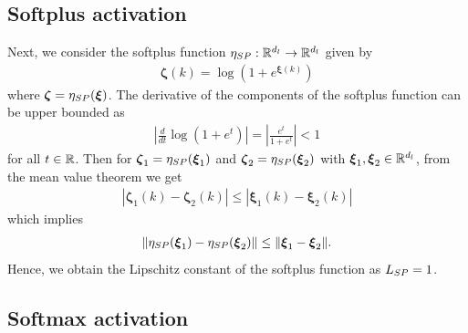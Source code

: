 \documentclass[review,supplement,onefignum,onetabnum]{siamonline250211}
\begin{document}
\subsection{Softplus activation}
Next, we consider the softplus function $\eta_{SP}: \mathbb{R}^{d_l} \rightarrow \mathbb{R}^{d_l}$ given by
%
\begin{equation}
\begin{split}
\boldsymbol{\zeta}(k) = \log \left(1+e^{\boldsymbol{\xi}(k)}\right)
\end{split}
\end{equation}
%
where $\boldsymbol{\zeta}= \eta_{SP} (\boldsymbol{\xi})$. The derivative of the components of the softplus function can be upper bounded as
%
\begin{equation}
\begin{split}
\left | \frac{d}{dt} \log(1+e^t)  \right |= \left | \frac{e^t}{1+e^t} \right | 
<1
\end{split}
\end{equation}
%
for all $t \in \mathbb{R}$. Then for  $\boldsymbol{\zeta}_1= \eta_{SP} (\boldsymbol{\xi}_1)$ and $\boldsymbol{\zeta}_2= \eta_{SP} (\boldsymbol{\xi}_2)$ with $\boldsymbol{\xi}_1, \boldsymbol{\xi}_2 \in \mathbb{R}^{d_l}$, from the mean value theorem we get
%
\begin{equation}
\begin{split}
| \boldsymbol{\zeta}_1(k) -  \boldsymbol{\zeta}_2(k) | \leq | \boldsymbol{\xi}_1(k) - \boldsymbol{\xi}_2(k) |
\end{split}
\end{equation}
%
which implies 
%
\begin{equation}
\begin{split}
\| \eta_{SP}(\boldsymbol{\xi}_1) -  \eta_{SP}(\boldsymbol{\xi}_2) \|  \leq \|  \boldsymbol{\xi}_1 - \boldsymbol{\xi}_2 \|.
\end{split}
\end{equation}
%
Hence, we obtain the Lipschitz constant of the softplus function as $L_{SP} =1$.

\subsection{Softmax activation}
\end{document}
